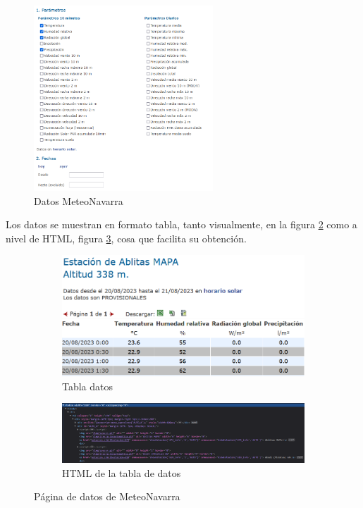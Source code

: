 \begin{figure} [H]
	\centering
	\includegraphics[width=0.6\textwidth]{fig/DatosMeteoNavarra.png}
	\caption[Apartado selección de datos MeteoNavarra]{Datos MeteoNavarra}
	\label{fig:ej6}
\end{figure}

Los datos se muestran en formato tabla, tanto visualmente, en la figura \ref{fig:sub7} como a nivel de HTML, figura \ref{fig:sub8}, cosa que facilita su obtención.

\begin{figure} [H]
	\centering
	\begin{subfigure}{.5\textwidth}
		\centering
		\includegraphics[width=.7\linewidth]{fig/MeteoNavarraData.png}
		\caption{Tabla datos}
		\label{fig:sub7}
	\end{subfigure}%
	\begin{subfigure}{.5\textwidth}
		\centering
		\includegraphics[width=.7\linewidth]{fig/MeteoNavarraCodeHTML.png}
		\caption{HTML de la tabla de datos}
		\label{fig:sub8}
	\end{subfigure}
	\caption{Página de datos de MeteoNavarra}
	\label{fig:ej29}
\end{figure}

